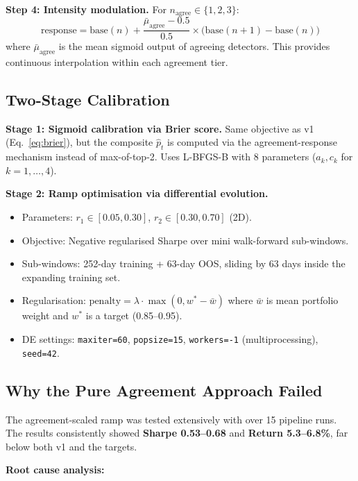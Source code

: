 \documentclass[11pt,a4paper]{article}
\begin{document}
\textbf{Step 4: Intensity modulation.} For $n_{\mathrm{agree}} \in \{1,2,3\}$:
\begin{equation}
  \mathrm{response} = \mathrm{base}(n) + \frac{\bar{\mu}_{\mathrm{agree}} - 0.5}{0.5} \times \big(\mathrm{base}(n+1) - \mathrm{base}(n)\big)
\end{equation}
where $\bar{\mu}_{\mathrm{agree}}$ is the mean sigmoid output of agreeing detectors. This provides continuous interpolation within each agreement tier.

\subsection{Two-Stage Calibration}

\textbf{Stage 1: Sigmoid calibration via Brier score.}
Same objective as v1 (Eq.~\ref{eq:brier}), but the composite $\hat{p}_t$ is computed via the agreement-response mechanism instead of max-of-top-2. Uses L-BFGS-B with 8 parameters ($a_k, c_k$ for $k=1,\ldots,4$).

\textbf{Stage 2: Ramp optimisation via differential evolution.}
\begin{itemize}[nosep]
  \item Parameters: $r_1 \in [0.05, 0.30]$, $r_2 \in [0.30, 0.70]$ (2D).
  \item Objective: Negative regularised Sharpe over mini walk-forward sub-windows.
  \item Sub-windows: 252-day training + 63-day OOS, sliding by 63 days inside the expanding training set.
  \item Regularisation: $\mathrm{penalty} = \lambda \cdot \max(0, w^* - \bar{w})$ where $\bar{w}$ is mean portfolio weight and $w^*$ is a target (0.85--0.95).
  \item DE settings: \texttt{maxiter=60}, \texttt{popsize=15}, \texttt{workers=-1} (multiprocessing), \texttt{seed=42}.
\end{itemize}

\subsection{Why the Pure Agreement Approach Failed}
\label{sec:v2-failure}

The agreement-scaled ramp was tested extensively with over 15 pipeline runs. The results consistently showed \textbf{Sharpe 0.53--0.68} and \textbf{Return 5.3--6.8\%}, far below both v1 and the targets.

\textbf{Root cause analysis:}
\end{document}
